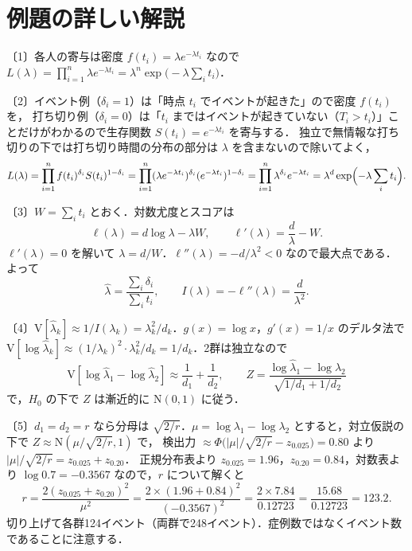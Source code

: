 \documentclass[a4paper,11pt,openany]{ltjsbook}
\newenvironment{kaitou}[1]{%
  \par\medskip\noindent
  \begin{tcolorbox}[enhanced,breakable,colback=bkgray!3,colframe=bkgray!60,boxrule=0.4pt,
    left=4pt,right=4pt,top=2pt,bottom=2pt,arc=1pt,
    title={\cref{#1}の解答},fonttitle=\bfseries\small,coltitle=white,colbacktitle=bkgray!80]}%
  {\end{tcolorbox}\par}
\newcommand{\V}{\mathrm{V}}
\newcommand{\Normal}{\mathrm{N}}
\begin{document}
\section{例題の詳しい解説}\label{sec:m01-kaisetsu}
\begin{kaitou}{reidai:m01-1}
〔1〕各人の寄与は密度 $f(t_i)=\lambda e^{-\lambda t_i}$ なので
$L(\lambda)=\prod_{i=1}^n\lambda e^{-\lambda t_i}=\lambda^n\exp\bigl(-\lambda\sum_it_i\bigr)$．

〔2〕イベント例（$\delta_i=1$）は「時点 $t_i$ でイベントが起きた」ので密度 $f(t_i)$ を，
打ち切り例（$\delta_i=0$）は「$t_i$ まではイベントが起きていない（$T_i>t_i$）」ことだけがわかるので生存関数 $S(t_i)=e^{-\lambda t_i}$ を寄与する．
独立で無情報な打ち切りの下では打ち切り時間の分布の部分は $\lambda$ を含まないので除いてよく，
\[
L(\lambda)=\prod_{i=1}^n f(t_i)^{\delta_i}S(t_i)^{1-\delta_i}=\prod_{i=1}^n(\lambda e^{-\lambda t_i})^{\delta_i}(e^{-\lambda t_i})^{1-\delta_i}=\prod_{i=1}^n\lambda^{\delta_i}e^{-\lambda t_i}=\lambda^{d}\exp\Bigl(-\lambda\sum_it_i\Bigr).
\]

〔3〕$W=\sum_it_i$ とおく．対数尤度とスコアは
\[
\ell(\lambda)=d\log\lambda-\lambda W,\qquad \ell'(\lambda)=\frac d\lambda-W .
\]
$\ell'(\lambda)=0$ を解いて $\lambda=d/W$．$\ell''(\lambda)=-d/\lambda^2<0$ なので最大点である．よって
\[
\hat\lambda=\frac{\sum_i\delta_i}{\sum_it_i},\qquad I(\lambda)=-\ell''(\lambda)=\frac{d}{\lambda^2}.
\]

〔4〕$\V[\hat\lambda_k]\approx1/I(\lambda_k)=\lambda_k^2/d_k$．$g(x)=\log x$，$g'(x)=1/x$ のデルタ法で
$\V[\log\hat\lambda_k]\approx(1/\lambda_k)^2\cdot\lambda_k^2/d_k=1/d_k$．2群は独立なので
\[
\V[\log\hat\lambda_1-\log\hat\lambda_2]\approx\frac1{d_1}+\frac1{d_2},\qquad
Z=\frac{\log\hat\lambda_1-\log\hat\lambda_2}{\sqrt{1/d_1+1/d_2}}
\]
で，$H_0$ の下で $Z$ は漸近的に $\Normal(0,1)$ に従う．

〔5〕$d_1=d_2=r$ なら分母は $\sqrt{2/r}$．$\mu=\log\lambda_1-\log\lambda_2$ とすると，対立仮説の下で $Z\approx\Normal(\mu/\sqrt{2/r},1)$ で，
検出力 $\approx\Phi\bigl(|\mu|/\sqrt{2/r}-z_{0.025}\bigr)=0.80$ より $|\mu|/\sqrt{2/r}=z_{0.025}+z_{0.20}$．
正規分布表より $z_{0.025}=1.96$，$z_{0.20}=0.84$，対数表より $\log0.7=-0.3567$ なので，$r$ について解くと
\[
r=\frac{2(z_{0.025}+z_{0.20})^2}{\mu^2}=\frac{2\times(1.96+0.84)^2}{(-0.3567)^2}=\frac{2\times7.84}{0.12723}=\frac{15.68}{0.12723}=123.2 .
\]
切り上げて各群124イベント（両群で248イベント）．症例数ではなくイベント数であることに注意する．
\end{kaitou}
\end{document}
